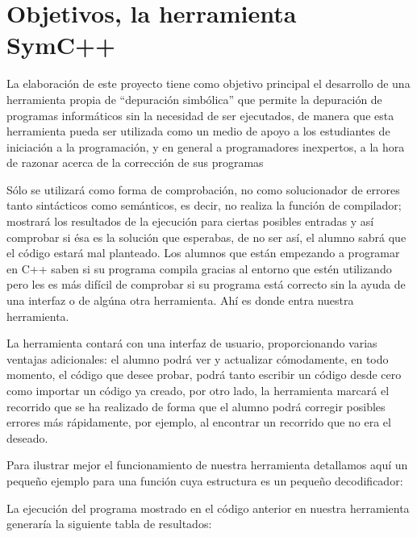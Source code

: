 \section{Objetivos, la herramienta SymC++}

La elaboraci\'on de este proyecto tiene como objetivo principal el desarrollo de una herramienta propia de ``depuraci\'on simb\'olica'' que permite la depuraci\'on de programas inform\'aticos sin la necesidad de ser ejecutados, de manera que esta herramienta pueda ser utilizada como un medio de apoyo a los estudiantes de iniciaci\'on a la programaci\'on, y en general a programadores inexpertos, a la hora de razonar acerca de la correcci\'on de sus programas

S\'olo se utilizar\'a como forma de comprobaci\'on, no como solucionador de errores tanto sint\'acticos como sem\'anticos, es decir, no realiza la funci\'on de compilador; mostrar\'a los resultados de la ejecuci\'on para ciertas posibles entradas y as\'i comprobar si \'esa es la soluci\'on que esperabas, de no ser as\'i, el alumno sabr\'a que el c\'odigo estar\'a mal planteado. Los alumnos que est\'an empezando a programar en C++ saben si su programa compila gracias al entorno que est\'en utilizando pero les es m\'as dif\'icil de comprobar si su programa est\'a correcto sin la ayuda de una interfaz o de alg\'una otra herramienta. Ah\'i es donde entra nuestra herramienta.

La herramienta contar\'a con una interfaz de usuario, proporcionando varias ventajas adicionales: el alumno podr\'a ver y actualizar c\'omodamente, en todo momento, el c\'odigo que desee probar, podr\'a tanto escribir un c\'odigo desde cero como importar un c\'odigo ya creado, por otro lado, la herramienta marcar\'a el recorrido que se ha realizado de forma que el alumno podr\'a corregir posibles errores m\'as r\'apidamente, por ejemplo, al encontrar un recorrido que no era el deseado.

Para ilustrar mejor el funcionamiento de nuestra herramienta detallamos aqu\'i un peque\~no ejemplo para una funci\'on cuya estructura es un peque\~no decodificador:



La ejecuci\'on del programa mostrado en el c\'odigo anterior en nuestra herramienta generar\'ia la siguiente tabla de resultados:

